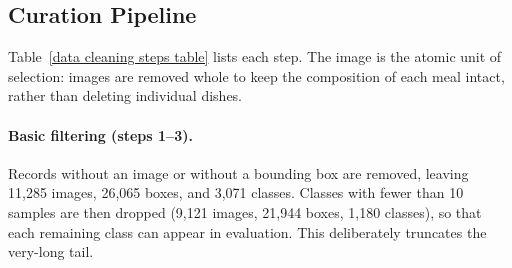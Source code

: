 \documentclass[sigconf, nonacm]{acmart}
\begin{document}
\subsection{Curation Pipeline}
\label{sec:pipeline}
Table~\ref{data cleaning steps table} lists each step. The image is the atomic unit of selection: images are removed whole to keep the composition of each meal intact, rather than deleting individual dishes.

\begin{table}[t]
  \centering
  \caption{Data filtering steps and the numbers of images, bounding boxes, and classes after each step (change from the previous step in parentheses; step~1 values are reproduced as logged).}
  \label{data cleaning steps table}
\end{table}

\paragraph{Basic filtering (steps 1--3).} Records without an image or without a bounding box are removed, leaving 11,285 images, 26,065 boxes, and 3,071 classes. Classes with fewer than 10 samples are then dropped (9,121 images, 21,944 boxes, 1,180 classes), so that each remaining class can appear in evaluation. This deliberately truncates the very-long tail.
\end{document}
